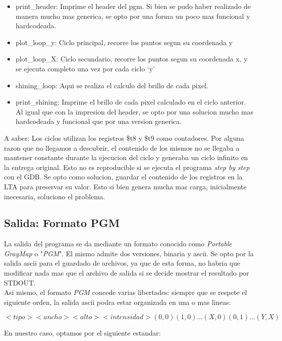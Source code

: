 \documentclass[10pt,spanish,a4paper,openany,notitlepage]{article}
\begin{document}
\begin{itemize}
\item print\_header: Imprime el header del pgm. Si bien se pudo haber realizado de manera mucho mas generica, se opto por una forma un poco mas funcional y hardcodeada.
\item plot\_loop\_y: Ciclo principal, recorre los puntos segun su coordenada y
\item plot\_loop\_X: Ciclo secundario, recorre los puntos segun su coordenada x, y se ejecuta completo una vez por cada ciclo `y'
\item shining\_loop: Aqui se realiza el calculo del brillo de cada pixel.
\item print\_shining: Imprime el brillo de cada pixel calculado en el ciclo anterior. Al igual que con la impresion del header, se opto por una solucion mucho mas hardcodeada y funcional que por una version generica.
\end{itemize}

A saber: Los ciclos utilizan los registros \$t8 y \$t9 como contadores. Por alguna razon que no llegamos a descubrir, el contenido de los mismos no se llegaba a mantener constante durante la ejecucion del ciclo y generaba un ciclo infinito en la entrega original. Esto no es reproducible si se ejecuta el programa \textit{step by step} con el GDB. Se opto como solucion, guardar el contenido de los registros en la LTA para preservar su valor. Esto si bien genera mucha mas carga, inicialmente inecesaria, soluciono el problema.


\subsection{Salida: Formato PGM}

La salida del programa se da mediante un formato conocido como \textit{Portable GrayMap} o "\textit{PGM}". El mismo admite dos versiones, binaria y ascii. Se opto por la salida ascii para el guardado de archivos, ya que de esta
forma, no habria que modificar nada mas que el archivo de salida si se decide mostrar el resultado por STDOUT.\\
Asi mismo, el formato \textit{PGM} concede varias libertades: siempre que se respete el siguiente orden, la salida ascii podra estar organizada en una o mas lineas:

\[ <tipo> <ancho> <alto> <intensidad> (0,0) (1,0) ... (X,0) (0,1) ... (Y,X)  \] 

En nuestro caso, optamos por el siguiente estandar:
\end{document}
